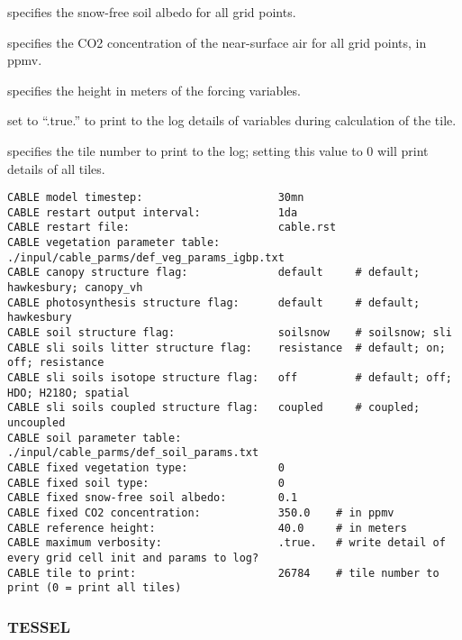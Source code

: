   specifies the
 snow-free soil albedo for all grid points.

  specifies the CO2
 concentration of the near-surface air for all grid points,
 in ppmv.

  specifies the height in meters
 of the forcing variables.

  set to ``.true.'' to print to
 the log details of variables during calculation of the tile.

  specifies the tile number to print to
 the log; setting this value to 0 will print details of all tiles.
 

 \begin{Verbatim}[frame=single]
CABLE model timestep:                     30mn
CABLE restart output interval:            1da
CABLE restart file:                       cable.rst
CABLE vegetation parameter table:         ./inpul/cable_parms/def_veg_params_igbp.txt
CABLE canopy structure flag:              default     # default; hawkesbury; canopy_vh
CABLE photosynthesis structure flag:      default     # default; hawkesbury
CABLE soil structure flag:                soilsnow    # soilsnow; sli
CABLE sli soils litter structure flag:    resistance  # default; on; off; resistance
CABLE sli soils isotope structure flag:   off         # default; off; HDO; H218O; spatial
CABLE sli soils coupled structure flag:   coupled     # coupled; uncoupled
CABLE soil parameter table:               ./inpul/cable_parms/def_soil_params.txt
CABLE fixed vegetation type:              0
CABLE fixed soil type:                    0
CABLE fixed snow-free soil albedo:        0.1
CABLE fixed CO2 concentration:            350.0    # in ppmv
CABLE reference height:                   40.0     # in meters
CABLE maximum verbosity:                  .true.   # write detail of every grid cell init and params to log?
CABLE tile to print:                      26784    # tile number to print (0 = print all tiles)
 \end{Verbatim}
 

 
 
 \subsubsection{TESSEL} \label{sssec:lsm_tessel}
 

 
  

